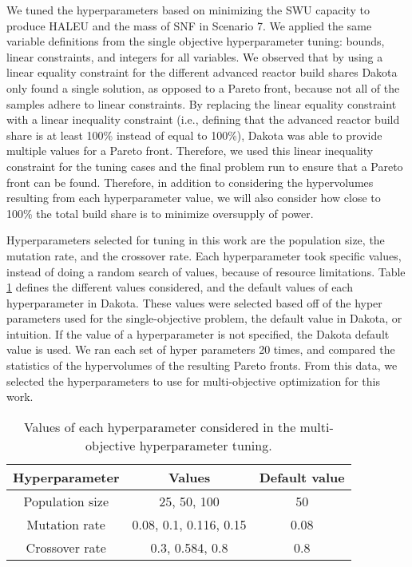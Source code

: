 We tuned the hyperparameters based on minimizing the \gls{SWU} capacity 
to produce \gls{HALEU} and the mass of \gls{SNF} in Scenario 7.
We applied the same variable definitions 
from the single objective hyperparameter 
tuning: bounds, linear constraints, and integers for 
all variables. We observed that by using a linear equality constraint for 
the different advanced reactor build shares 
Dakota only found a single solution, as opposed to a Pareto front, because 
not all of the samples adhere to linear constraints. By replacing the 
linear equality constraint with a linear 
inequality constraint (i.e., defining that the advanced reactor build share is 
at least 100\% instead of equal to 100\%), Dakota was able to provide multiple 
values for a Pareto front. 
Therefore, we used this linear inequality constraint for the tuning cases and 
the final problem run to ensure that a Pareto front can be found. Therefore, 
in addition to considering the hypervolumes resulting from each hyperparameter 
value, we will also consider how close to 100\% the total build share is 
to minimize oversupply of power.

Hyperparameters selected for tuning in this work are the 
population size, the mutation rate, and the crossover rate. Each 
hyperparameter took specific values, instead of doing a random 
search of values, because of resource limitations. 
Table \ref{tab:moga_tuning} defines the different values considered, 
and the default values of each hyperparameter in Dakota. 
 These values 
were selected based off of the hyper parameters used for the single-objective 
problem, the default value in Dakota, or intuition. If the value of a 
hyperparameter is not specified, the Dakota default value is used.  
We ran each set of hyper 
parameters 20 times, and compared the statistics of the hypervolumes of 
the resulting Pareto fronts. From this data, we selected the 
hyperparameters to use for multi-objective optimization for this work. 

\begin{table}
    \centering 
    \caption{Values of each hyperparameter considered in the 
    multi-objective hyperparameter tuning.}
    \label{tab:moga_tuning}
    \begin{tabular}{c c c} 
        \hline
        Hyperparameter & Values & Default value\\
        \hline
        Population size & 25, 50, 100 & 50\\
        Mutation rate & 0.08, 0.1, 0.116, 0.15 & 0.08 \\
        Crossover rate & 0.3, 0.584, 0.8 & 0.8 \\
        \hline
        
    \end{tabular}
\end{table}


